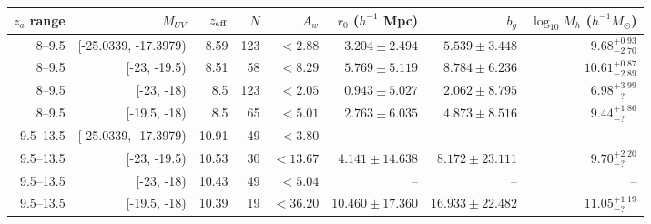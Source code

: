 \begin{tabular}{rrrrrrrr}
\toprule
$z_a$ range & $M_{UV}$ & $z_{\rm eff}$ & $N$ & $A_w$ & $r_0$ ($h^{-1}$ Mpc) & $b_g$ & $\log_{10} M_h$ ($h^{-1}M_\odot$) \\
\midrule
8--9.5 & [-25.0339, -17.3979) & 8.59 & 123 & $<2.88$ & $3.204\pm2.494$ & $5.539\pm3.448$ & $9.68^{+0.93}_{-2.70}$ \\
8--9.5 & [-23, -19.5) & 8.51 & 58 & $<8.29$ & $5.769\pm5.119$ & $8.784\pm6.236$ & $10.61^{+0.87}_{-2.89}$ \\
8--9.5 & [-23, -18) & 8.5 & 123 & $<2.05$ & $0.943\pm5.027$ & $2.062\pm8.795$ & $6.98^{+3.99}_{-?}$ \\
8--9.5 & [-19.5, -18) & 8.5 & 65 & $<5.01$ & $2.763\pm6.035$ & $4.873\pm8.516$ & $9.44^{+1.86}_{-?}$ \\
9.5--13.5 & [-25.0339, -17.3979) & 10.91 & 49 & $<3.80$ & -- & -- & -- \\
9.5--13.5 & [-23, -19.5) & 10.53 & 30 & $<13.67$ & $4.141\pm14.638$ & $8.172\pm23.111$ & $9.70^{+2.20}_{-?}$ \\
9.5--13.5 & [-23, -18) & 10.43 & 49 & $<5.04$ & -- & -- & -- \\
9.5--13.5 & [-19.5, -18) & 10.39 & 19 & $<36.20$ & $10.460\pm17.360$ & $16.933\pm22.482$ & $11.05^{+1.19}_{-?}$ \\
\bottomrule
\end{tabular}
